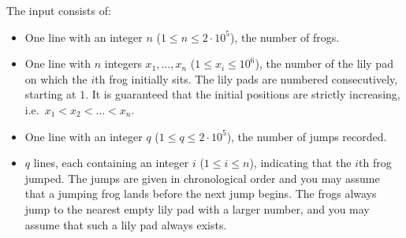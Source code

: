 
	The input consists of:
	\begin{itemize}
		\item One line with an integer $n$ ($1\leq n \leq 2\cdot10^5$), the number of frogs.
		\item One line with $n$ integers $x_1,\dots, x_n$ ($1\leq x_i \leq 10^6$),
			the number of the lily pad on which the $i$th frog initially sits.
			The lily pads are numbered consecutively, starting at $1$. 
			It is guaranteed that the initial positions are strictly increasing, i.e.\
			$x_1 < x_2 < \dots < x_n$.
		\item One line with an integer $q$ ($1\leq q \leq 2\cdot10^5$), the
			number of jumps recorded.
		\item $q$ lines, each containing an integer $i$ ($1\leq i\leq n$), indicating
			that the $i$th frog jumped. The jumps are given in chronological
			order and you may assume that a jumping frog lands before the next
			jump begins.
			The frogs always jump to the nearest empty lily pad with a larger number,
			and you may assume that such a lily pad always exists.
	\end{itemize}
